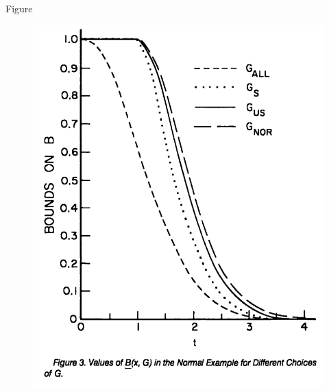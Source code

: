 \begin{frame}{Figure}

\begin{figure}[t]
\includegraphics[width=0.65\textheight]{figures/figure3}
\centering
\end{figure}

\end{frame}



